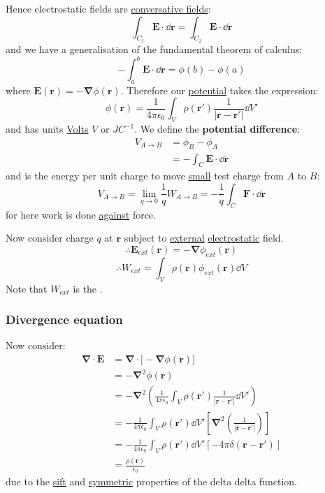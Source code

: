 \documentclass{article}
\begin{document}
Hence electrostatic fields are \underline{conversative fields}:
$$\int_{C_1}\boldsymbol{E}\cdot\dd\boldsymbol{r}=
\int_{C_2}\boldsymbol{E}\cdot\dd\boldsymbol{r}$$
and we have a generalisation of the fundamental theorem of calculus:
$$-\int_{a}^{b}\boldsymbol{E}\cdot\dd\boldsymbol{r}
=\phi(b)-\phi(a)$$
where $\boldsymbol{E}(\boldsymbol{r})
=-\boldsymbol{\nabla}\phi(\boldsymbol{r})$. Therefore
our \underline{potential} takes the expression:
$$\phi(\boldsymbol{r})
=\frac{1}{4\pi\epsilon_0}
\int_V\rho(\boldsymbol{r}')
\frac{1}{|\boldsymbol{r}-\boldsymbol{r}'|}
\dd V'$$
and has units \underline{Volts} $V$ or $JC^{-1}$.
We define the \textbf{potential difference}:
\begin{align*}
    V_{A\rightarrow B}
    &=\phi_B-\phi_A \\
    &=-\int_C\boldsymbol{E}\cdot\dd\boldsymbol{r}
\end{align*}
and is the energy per unit charge to move
\underline{small} test charge from $A$ to $B$:
$$V_{A\rightarrow B}=
\lim_{q\rightarrow 0}\frac{1}{q}W_{A\rightarrow B}
=-\frac{1}{q}\int_C\boldsymbol{F}\cdot\dd\boldsymbol{r}$$
for here work is done \underline{against} force.

Now consider charge $q$ at $\boldsymbol{r}$ subject to \underline{external}
\underline{electrostatic} field.
$$\therefore\boldsymbol{E}_{ext}(\boldsymbol{r})
=-\boldsymbol{\nabla}\phi_{ext}(\boldsymbol{r})$$
$$\therefore W_{ext}=
\int_V\rho(\boldsymbol{r})\phi_{ext}
(\boldsymbol{r})\dd V$$
Note that $W_{ext}$ is the .

\newpage

\subsubsection{Divergence equation}
Now consider:
\begin{align*}
    \boldsymbol{\nabla}\cdot
    \boldsymbol{E}
    &=\boldsymbol{\nabla}\cdot
    \bigl[-\boldsymbol{\nabla}
    \phi(\boldsymbol{r})\bigr] \\
    &=-\boldsymbol{\nabla}^2\phi
    (\boldsymbol{r}) \\
    &=-\boldsymbol{\nabla}^2
    \left(\frac{1}{4\pi\epsilon_0}
    \int_V\rho(\boldsymbol{r}')
    \frac{1}{|\boldsymbol{r}-\boldsymbol{r}'|}
    \dd V'\right) \\
    &=-\frac{1}{4\pi\epsilon_0}
    \int_V\rho(\boldsymbol{r}')\dd V'
    \left[\boldsymbol{\nabla}^2
    \left(\frac{1}{|\boldsymbol{r}-\boldsymbol{r}'|}\right)\right] \\
    &=-\frac{1}{4\pi\epsilon_0}
    \int_V\rho(\boldsymbol{r}')\dd V'
    \left[-4\pi\delta(\boldsymbol{r}
    -\boldsymbol{r}')\right] \\
    &=\frac{\rho(\boldsymbol{r})}{\epsilon_0}
\end{align*}
due to the \underline{sift} and \underline{symmetric}
properties of the delta delta function.
\end{document}
